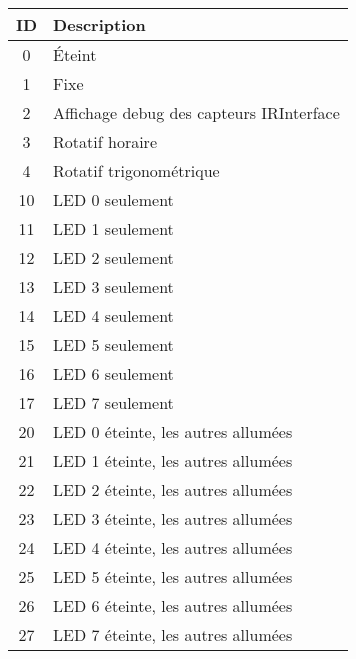 	\begin{tabular}{|cl|} \hline
		ID & Description \\ \hline
		0  & Éteint \\
		1  & Fixe \\
		2  & Affichage debug des capteurs IRInterface \\
		3  & Rotatif horaire \\
		4  & Rotatif trigonométrique \\
		10 & LED 0 seulement \\
		11 & LED 1 seulement \\
		12 & LED 2 seulement \\
		13 & LED 3 seulement \\
		14 & LED 4 seulement \\
		15 & LED 5 seulement \\
		16 & LED 6 seulement \\
		17 & LED 7 seulement \\
		20 & LED 0 éteinte, les autres allumées \\
		21 & LED 1 éteinte, les autres allumées \\
		22 & LED 2 éteinte, les autres allumées \\
		23 & LED 3 éteinte, les autres allumées \\
		24 & LED 4 éteinte, les autres allumées \\
		25 & LED 5 éteinte, les autres allumées \\
		26 & LED 6 éteinte, les autres allumées \\
		27 & LED 7 éteinte, les autres allumées \\
		\hline
	\end{tabular}
